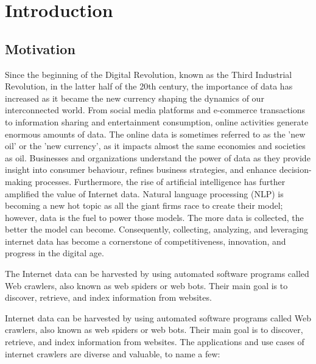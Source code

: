 \chapter{Introduction}
\label{chap:introduction}
\section{Motivation}


Since the beginning of the Digital Revolution, known as the Third Industrial Revolution, in the latter half of the 20th century, the importance of data has increased as it became the new currency shaping the dynamics of our interconnected world. From social media platforms and e-commerce transactions to information sharing and entertainment consumption, online activities generate enormous amounts of data. The online data is sometimes referred to as the 'new oil' or the 'new currency', as it impacts almost the same economies and societies as oil. Businesses and organizations understand the power of data as they provide insight into consumer behaviour, refines business strategies, and enhance decision-making processes. Furthermore, the rise of artificial intelligence has further amplified the value of Internet data. Natural language processing (NLP) is becoming a new hot topic as all the giant firms race to create their model; however, data is the fuel to power those models. The more data is collected, the better the model can become. Consequently, collecting, analyzing, and leveraging internet data has become a cornerstone of competitiveness, innovation, and progress in the digital age.

The Internet data can be harvested by using automated software programs called Web crawlers, also known as web spiders or web bots. Their main goal is to discover, retrieve, and index information from websites.

Internet data can be harvested by using automated software programs called Web crawlers, also known as web spiders or web bots. Their main goal is to discover, retrieve, and index information from websites. The applications and use cases of internet crawlers are diverse and valuable, to name a few: 

